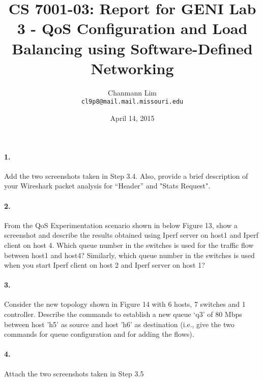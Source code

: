 \documentclass[a4paper]{article}
\begin{document}
\title{CS 7001-03: Report for GENI Lab 3 - QoS Configuration and Load Balancing using Software-Defined Networking}
\author{Chanmann Lim\\ 
	\texttt{cl9p8@mail.mail.missouri.edu}}
\date{April 14, 2015}
\maketitle

\paragraph{1. } Add the two screenshots taken in Step 3.4. Also, provide a brief description of your Wireshark packet
analysis for “Header” and "Stats Request".\\

\paragraph{2. } From the QoS Experimentation scenario shown in below Figure 13, show a screenshot and describe the results obtained using Iperf server on host1 and Iperf client on host 4. Which queue number in the switches is used for the traffic flow between host1 and host4? Similarly, which queue number in the switches is used when you start Iperf client on host 2 and Iperf server on host 1?

\paragraph{3. } Consider the new topology shown in Figure 14 with 6 hosts, 7 switches and 1 controller. Describe the commands to establish a new queue ‘q3’ of 80 Mbps between host 'h5' as source and host 'h6' as destination (i.e., give the two commands for queue configuration and for adding the flows).

\paragraph{4. } Attach the two screenshots taken in Step 3.5

\end{document}
